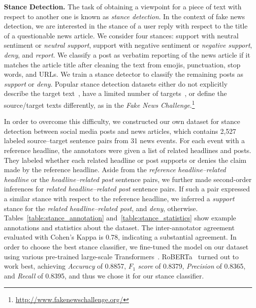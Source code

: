 \documentclass[sigconf]{acmart}
\theoremstyle{definition}
\theoremstyle{hypothesis}
\begin{document}
\textbf{Stance Detection.} The task of obtaining a viewpoint for a piece of text with respect to another one is known as \textit{stance detection}. 
In the context of fake news detection, we are interested in the stance of a user reply with respect to the title of a questionable news article.
We consider four stances: support with neutral sentiment or \textit{neutral support}, support with negative sentiment or \textit{negative support}, \textit{deny}, and \textit{report}. We classify a post as verbatim reporting of the news article if it matches the article title after cleaning the text from emojis, punctuation, stop words, and URLs.
We train a stance detector to classify the remaining posts as 
\textit{support} or \textit{deny}.
Popular stance detection datasets either do not explicitly describe the target text~\cite{derczynski-etal-2017-semeval}, have a limited number of targets~\cite{sobhani-etal-2017-dataset,mohammad-etal-2016-semeval}, or define the source/target texts differently, as in the \emph{Fake News Challenge}.\footnote{\scriptsize{\url{http://www.fakenewschallenge.org/}}} 

In order to overcome this difficulty, we constructed our own dataset for stance detection between social media posts and news articles, which contains 2,527 labeled source--target sentence pairs from 31 news events. For each event with a reference headline, the annotators were given a list of related headlines and posts. They labeled whether each related headline or post supports or denies the claim made by the reference headline. Aside from the \emph{reference headline--related headline} or the \emph{headline--related post} sentence pairs, we further made second-order inferences for \emph{related headline--related post} sentence pairs. If such a pair expressed a similar stance with respect to the reference headline, we inferred a {\it support} stance for the \emph{related headline--related post}, and \textit{deny}, otherwise. Tables~\ref{table:stance_annotation} and~\ref{table:stance_statistics} show example annotations and statistics about the dataset. The inter-annotator agreement evaluated with Cohen's Kappa is 0.78, indicating a substantial agreement. In order to choose the best stance classifier, we fine-tuned the model on our dataset using various pre-trained large-scale Transformers~\cite{devlin2019bert,liu2019roberta}. RoBERTa~\cite{liu2019roberta} turned out to work best, achieving \textit{Accuracy} of 0.8857, \textit{$F_1$ score} of 0.8379, \textit{Precision} of 0.8365, and \textit{Recall} of 0.8395, 
and thus we chose it for our stance classifier.
\end{document}
